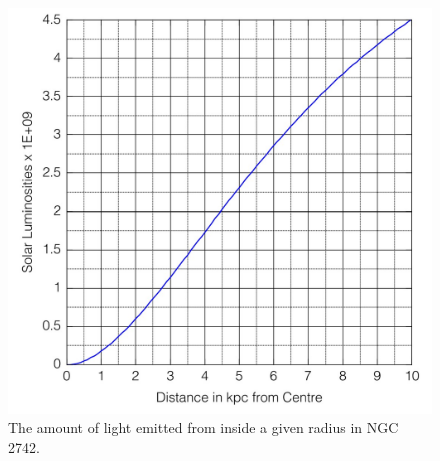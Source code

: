 \documentclass[11pt]{article}%
\begin{document}
\begin{figure}[h!]
\center
\includegraphics[scale=0.6]{light curve 2742.jpg}
\caption{The amount of light emitted from inside a given radius in NGC 2742.}
\label{fig:luminosity}
\end{figure}
\end{document}
